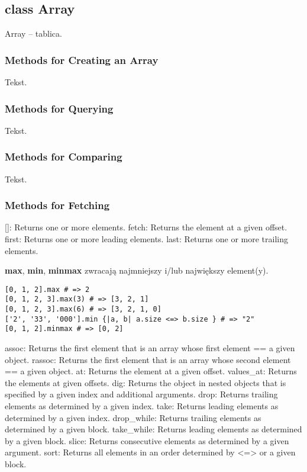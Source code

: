 \subsection{class Array}
Array -- tablica.

\subsubsection{Methods for Creating an Array}
Tekst.

\subsubsection{Methods for Querying}
Tekst.

\subsubsection{Methods for Comparing}
Tekst.

\subsubsection{Methods for Fetching}
{\footnotesize
[]: Returns one or more elements.
fetch: Returns the element at a given offset.
first: Returns one or more leading elements.
last: Returns one or more trailing elements.
}

\textbf{max}, \textbf{min}, \textbf{minmax} zwracają najmniejszy i/lub największy element(y).
\begin{verbatim}
[0, 1, 2].max # => 2
[0, 1, 2, 3].max(3) # => [3, 2, 1]
[0, 1, 2, 3].max(6) # => [3, 2, 1, 0]
['2', '33', '000'].min {|a, b| a.size <=> b.size } # => "2"
[0, 1, 2].minmax # => [0, 2]
\end{verbatim}
    
{\footnotesize
assoc: Returns the first element that is an array whose first element == a given object.
rassoc: Returns the first element that is an array whose second element == a given object.
at: Returns the element at a given offset.
values\_at: Returns the elements at given offsets.
dig: Returns the object in nested objects that is specified by a given index and additional arguments.
drop: Returns trailing elements as determined by a given index.
take: Returns leading elements as determined by a given index.
drop\_while: Returns trailing elements as determined by a given block.
take\_while: Returns leading elements as determined by a given block.
slice: Returns consecutive elements as determined by a given argument.
sort: Returns all elements in an order determined by <=> or a given block.
}


